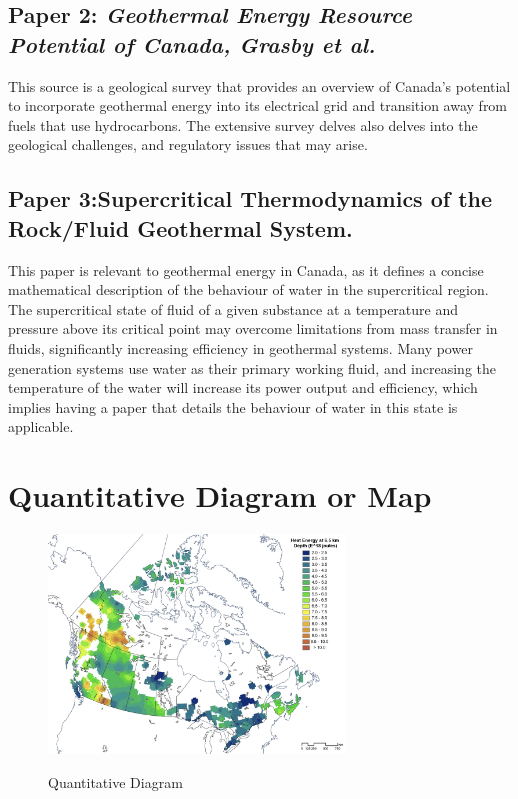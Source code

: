 \documentclass[12pt,a4paper]{article}
\begin{document}
        \subsection{Paper 2: \textit{Geothermal Energy Resource Potential of Canada, Grasby et al.}}
            \textbf{}

            \vspace{0.5cm}
            This source is a geological survey that provides an overview of Canada's potential to incorporate geothermal energy into its electrical grid and transition away from fuels that use hydrocarbons. The extensive survey delves also delves into the geological challenges, and regulatory issues that may arise. 


        \subsection{Paper 3:Supercritical Thermodynamics of the Rock/Fluid Geothermal System.}
            \textbf{}
            
            \vspace{0.5cm}
            This paper is relevant to geothermal energy in Canada, as it defines a concise mathematical description of the behaviour of water in the supercritical region. The supercritical state of fluid of a given substance at a temperature and pressure above its critical point may overcome limitations from mass transfer in fluids, significantly increasing efficiency in geothermal systems. Many power generation systems use water as their primary working fluid, and increasing the temperature of the water will increase its power output and efficiency, which implies having a paper that details the behaviour of water in this state is applicable. 

    \section[Diagram]{Quantitative Diagram or Map}
        \begin{figure}[H]
            \centering
            \includegraphics[width=0.7\textwidth]{figures/diagram.png}
            \caption{Quantitative Diagram}
            \textbf{}
        \end{figure}
\end{document}
